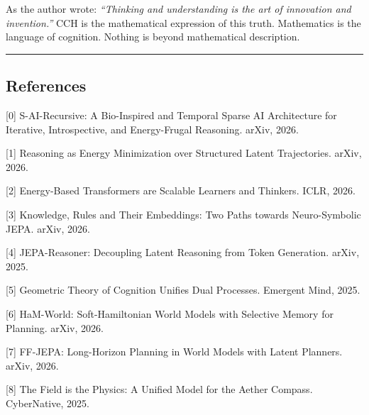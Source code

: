 \documentclass[
  11pt,
  a4paper,
]{article}
\begin{document}
As the author wrote: \emph{``Thinking and understanding is the art of
innovation and invention.''} CCH is the mathematical expression of this
truth. Mathematics is the language of cognition. Nothing is beyond
mathematical description.

\begin{center}\rule{0.5\linewidth}{0.5pt}\end{center}

\subsection{References}\label{references}

{[}0{]} S-AI-Recursive: A Bio-Inspired and Temporal Sparse AI
Architecture for Iterative, Introspective, and Energy-Frugal Reasoning.
arXiv, 2026.

{[}1{]} Reasoning as Energy Minimization over Structured Latent
Trajectories. arXiv, 2026.

{[}2{]} Energy-Based Transformers are Scalable Learners and Thinkers.
ICLR, 2026.

{[}3{]} Knowledge, Rules and Their Embeddings: Two Paths towards
Neuro-Symbolic JEPA. arXiv, 2026.

{[}4{]} JEPA-Reasoner: Decoupling Latent Reasoning from Token
Generation. arXiv, 2025.

{[}5{]} Geometric Theory of Cognition Unifies Dual Processes. Emergent
Mind, 2025.

{[}6{]} HaM-World: Soft-Hamiltonian World Models with Selective Memory
for Planning. arXiv, 2026.

{[}7{]} FF-JEPA: Long-Horizon Planning in World Models with Latent
Planners. arXiv, 2026.

{[}8{]} The Field is the Physics: A Unified Model for the Aether
Compass. CyberNative, 2025.
\end{document}
